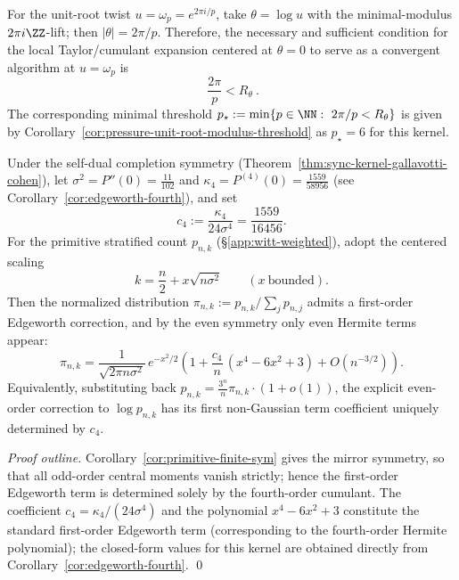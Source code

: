 \begin{corollary}\label{cor:sync-kernel-unit-root-twist-threshold}
For the unit-root twist \(u=\omega_p=e^{2\pi i/p}\), take \(\theta=\log u\) with the minimal-modulus \(2\pi i\ZZ\)-lift; then \(|\theta|=2\pi/p\).
Therefore, the necessary and sufficient condition for the local Taylor/cumulant expansion centered at \(\theta=0\) to serve as a convergent algorithm at \(u=\omega_p\) is
\[
\boxed{\ \frac{2\pi}{p}<R_\theta\ }.
\]
The corresponding minimal threshold
\(
p_\star:=\min\{p\in\NN:\ 2\pi/p<R_\theta\}
\)
is given by Corollary~\ref{cor:pressure-unit-root-modulus-threshold} as \(p_\star=6\) for this kernel.
\end{corollary}

\begin{theorem}\label{thm:sync-kernel-even-edgeworth-c4}
Under the self-dual completion symmetry (Theorem~\ref{thm:sync-kernel-gallavotti-cohen}), let
\(
\sigma^2=P''(0)=\frac{11}{102}
\)
and
\(
\kappa_4=P^{(4)}(0)=\frac{1559}{58956}
\)
(see Corollary~\ref{cor:edgeworth-fourth}), and set
\[
c_4:=\frac{\kappa_4}{24\sigma^4}=\frac{1559}{16456}.
\]
For the primitive stratified count \(p_{n,k}\) (\S\ref{app:witt-weighted}), adopt the centered scaling
\[
k=\frac{n}{2}+x\sqrt{n\sigma^2}\qquad(x\ \text{bounded}).
\]
Then the normalized distribution \(\pi_{n,k}:=p_{n,k}/\sum_j p_{n,j}\) admits a first-order Edgeworth correction, and by the even symmetry only even Hermite terms appear:
\begin{equation}\label{eq:sync-kernel-edgeworth-even}
\boxed{\;
\pi_{n,k}
=\frac{1}{\sqrt{2\pi n\sigma^2}}\,e^{-x^2/2}\left(1+\frac{c_4}{n}\,(x^4-6x^2+3)+O(n^{-3/2})\right).\;}
\end{equation}
Equivalently, substituting back \(p_{n,k}=\frac{3^n}{n}\pi_{n,k}\cdot(1+o(1))\), the explicit even-order correction to \(\log p_{n,k}\) has its first non-Gaussian term coefficient uniquely determined by \(c_4\).
\end{theorem}

\begin{proof}[Proof outline]
Corollary~\ref{cor:primitive-finite-sym} gives the mirror symmetry, so that all odd-order central moments vanish strictly; hence the first-order Edgeworth term is determined solely by the fourth-order cumulant.
The coefficient \(c_4=\kappa_4/(24\sigma^4)\) and the polynomial \(x^4-6x^2+3\) constitute the standard first-order Edgeworth term (corresponding to the fourth-order Hermite polynomial);
the closed-form values for this kernel are obtained directly from Corollary~\ref{cor:edgeworth-fourth}. \qed
\end{proof}

